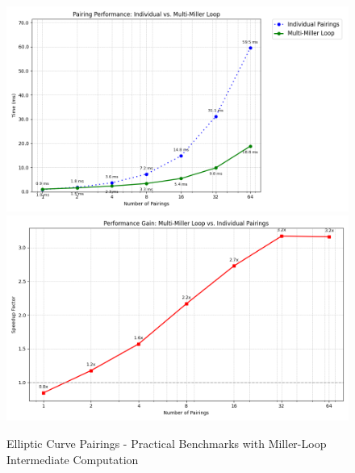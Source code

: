 \begin{figure}
    \centering
    \includegraphics[width=0.75\linewidth]{pairing_comparison.png}
        \includegraphics[width=0.75\linewidth]{pairing_comparison2.png}
    \caption{Elliptic Curve Pairings - Practical Benchmarks with Miller-Loop Intermediate Computation}
    \label{fig:enter-label}
\end{figure}
